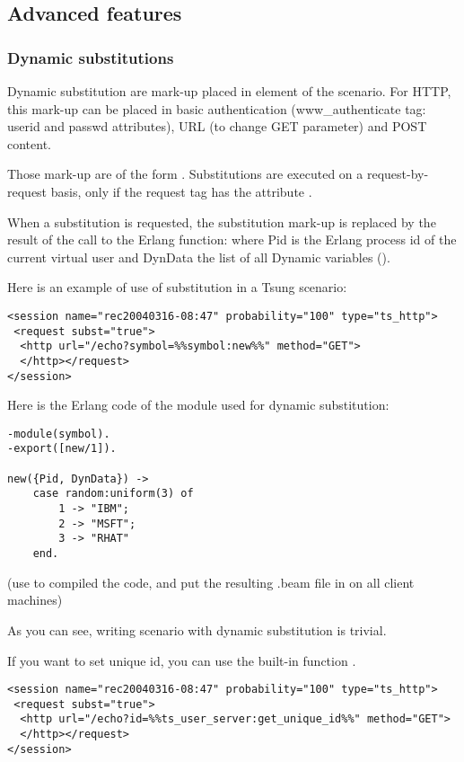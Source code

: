 \documentclass{IDXDOC-en}
\begin{document}
\subsection{Advanced features}

\subsubsection{Dynamic substitutions}

 Dynamic substitution are mark-up placed in element of the scenario.
For HTTP, this mark-up can be placed in basic authentication (www\_authenticate
tag: userid and passwd attributes), URL (to change GET parameter)
and POST content.

Those mark-up are of the form .
Substitutions are executed on a request-by-request basis, only if the
request tag has the attribute .

When a substitution is requested, the substitution mark-up is replaced by
the result of the call to the Erlang function:
 where Pid is the Erlang process
id of the current virtual user and DynData the list of all Dynamic
variables ().

Here is an example of use of substitution in a Tsung scenario:

\begin{Verbatim}
<session name="rec20040316-08:47" probability="100" type="ts_http">
 <request subst="true">
  <http url="/echo?symbol=%%symbol:new%%" method="GET">
  </http></request>
</session>
\end{Verbatim}

Here is the Erlang code of the module used for dynamic substitution:

\begin{Verbatim}
-module(symbol).
-export([new/1]).

new({Pid, DynData}) ->
    case random:uniform(3) of
        1 -> "IBM";
        2 -> "MSFT";
        3 -> "RHAT"
    end.
\end{Verbatim}

(use  to compiled the code, and put the resulting .beam
file in  on all client
machines)

As you can see, writing scenario with dynamic substitution is trivial.

If you want to set unique id, you can use the built-in function
.
\begin{Verbatim}
<session name="rec20040316-08:47" probability="100" type="ts_http">
 <request subst="true">
  <http url="/echo?id=%%ts_user_server:get_unique_id%%" method="GET">
  </http></request>
</session>
\end{Verbatim}
\end{document}
